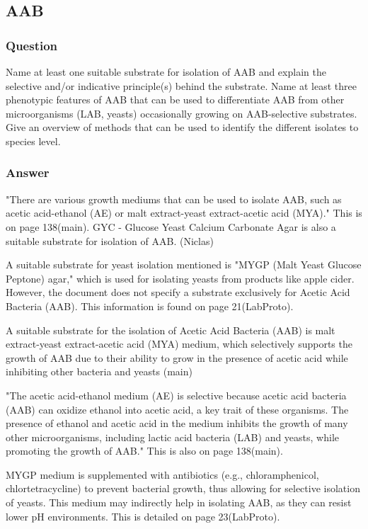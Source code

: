 \subsection{AAB}
\subsubsection*{Question}
Name at least one suitable substrate for isolation of AAB and explain the selective and/or indicative principle(s) behind the substrate. Name at least three phenotypic features of AAB that can be used to differentiate AAB from other microorganisms (LAB, yeasts) occasionally growing on AAB-selective substrates. Give an overview of methods that can be used to identify the different isolates to species level. 

\subsubsection*{Answer}
"There are various growth mediums that can be used to isolate AAB, such as acetic acid-ethanol (AE) or malt extract-yeast extract-acetic acid (MYA)."
This is on page 138(main).
GYC - Glucose Yeast Calcium Carbonate Agar is also a suitable substrate for isolation of AAB. (Niclas)

A suitable substrate for yeast isolation mentioned is "MYGP (Malt Yeast Glucose Peptone) agar," which is used for isolating yeasts from products like apple cider. However, the document does not specify a substrate exclusively for Acetic Acid Bacteria (AAB). This information is found on page 21(LabProto).

A suitable substrate for the isolation of Acetic Acid Bacteria (AAB) is malt extract-yeast extract-acetic acid (MYA) medium, which selectively supports the growth of AAB due to their ability to grow in the presence of acetic acid while inhibiting other bacteria and yeasts (main) 

"The acetic acid-ethanol medium (AE) is selective because acetic acid bacteria (AAB) can oxidize ethanol into acetic acid, a key trait of these organisms. The presence of ethanol and acetic acid in the medium inhibits the growth of many other microorganisms, including lactic acid bacteria (LAB) and yeasts, while promoting the growth of AAB."
This is also on page 138(main).

MYGP medium is supplemented with antibiotics (e.g., chloramphenicol, chlortetracycline) to prevent bacterial growth, thus allowing for selective isolation of yeasts. This medium may indirectly help in isolating AAB, as they can resist lower pH environments. This is detailed on page 23(LabProto).

